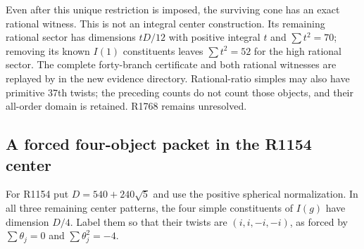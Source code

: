 Even after this unique restriction is imposed, the surviving cone has an
exact rational witness. This is not an integral center construction.
Its remaining rational sector has dimensions $tD/12$ with positive
integral $t$ and $\sum t^2=70$; removing its known $I(1)$ constituents
leaves $\sum t^2=52$ for the high rational sector.
The complete forty-branch certificate and both rational witnesses are
replayed by  in the new evidence directory.
Rational-ratio simples may also have primitive 37th twists; the
preceding counts do not count those objects, and their all-order domain
is retained. R1768 remains unresolved.

\subsection{A forced four-object packet in the R1154 center}
\label{subsec:creative-r1154-packet}

For R1154 put $D=540+240\sqrt5$ and use the positive spherical
normalization. In all three remaining center patterns, the four simple
constituents of $I(g)$ have dimension $D/4$. Label them so that their
twists are $(i,i,-i,-i)$, as forced by
$\sum\theta_j=0$ and $\sum\theta_j^2=-4$.

